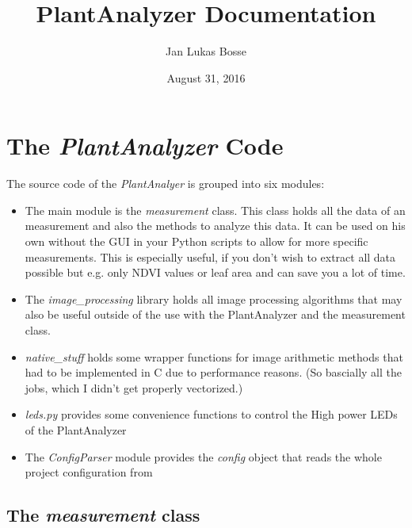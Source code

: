 \documentclass[a4paper,10pt,openany,oneside]{sphinxmanual}
\title{PlantAnalyzer Documentation}
\date{August 31, 2016}
\author{Jan Lukas Bosse}
\begin{document}
\maketitle
\tableofcontents
{}\label{index::doc}



\chapter{The \emph{PlantAnalyzer} Code}
\label{index:welcome-to-plantanalyzer-s-documentation}\label{index:the-plantanalyzer-code}
The source code of the \emph{PlantAnalyer} is grouped into six modules:
\begin{itemize}
\item {}
The main module is the \emph{measurement} class. This class holds all the data of an measurement and also the methods to analyze this data. It can be used on his own without the GUI in your Python scripts to allow for more specific measurements. This is especially useful, if you don't wish to extract all data possible but e.g. only NDVI values or leaf area and can save you a lot of time.

\item {}
The \emph{image\_processing} library holds all image processing algorithms that may also be useful outside of the use with the PlantAnalyzer and the measurement class.

\item {}
\emph{native\_stuff} holds some wrapper functions for image arithmetic methods that had to be implemented in C due to performance reasons. (So bascially all the jobs, which I didn't get properly vectorized.)

\item {}
\emph{leds.py} provides some convenience functions to control the High power LEDs of the PlantAnalyzer

\item {}
The \emph{ConfigParser} module provides the \emph{config} object that reads the whole project configuration from 

\end{itemize}


\section{The \emph{measurement} class}
\label{index:the-measurement-class}
\end{document}
